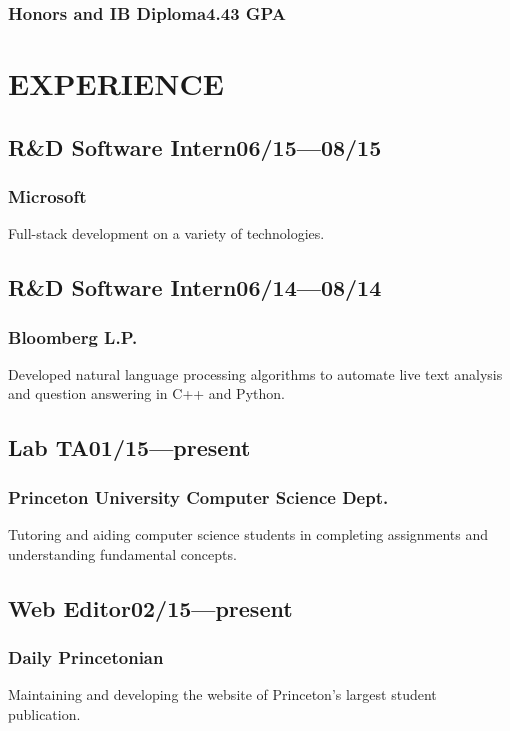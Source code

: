 \documentclass[11pt]{article}
\begin{document}
\begin{multicols}{2}
\subsubsection*{Honors and IB Diploma\hfill\textnormal{4.43 GPA}}
\vspace{1.5\baselineskip}

\section*{EXPERIENCE}
\subsection*{R\&D Software Intern\hfill\textnormal{06/15---08/15}}
\subsubsection*{Microsoft}
Full-stack development on a variety of technologies.

\subsection*{R\&D Software Intern\hfill\textnormal{06/14---08/14}}
\subsubsection*{Bloomberg L.P.}
Developed natural language processing algorithms to automate live text analysis and question answering in C++ and Python.

\subsection*{Lab TA\hfill\textnormal{01/15---present}}
\subsubsection*{Princeton University Computer Science Dept.}
Tutoring and aiding computer science students in completing assignments and understanding fundamental concepts.

\subsection*{Web Editor\hfill\textnormal{02/15---present}}
\subsubsection*{Daily Princetonian}
Maintaining and developing the website of Princeton's largest student publication.


\end{multicols}
\end{document}
